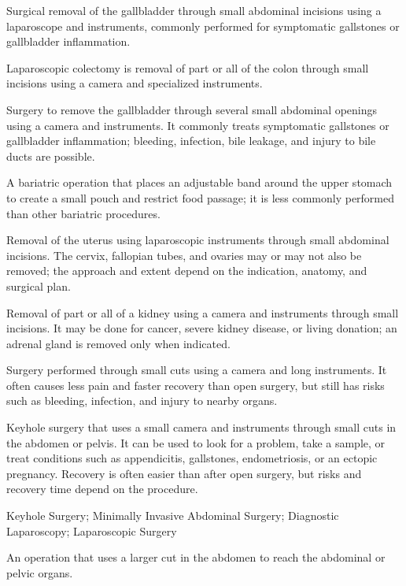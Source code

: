  Surgical removal of the gallbladder through small abdominal incisions using a laparoscope and instruments, commonly performed for symptomatic gallstones or gallbladder inflammation.

 Laparoscopic colectomy is removal of part or all of the colon through small incisions using a camera and specialized instruments.

 Surgery to remove the gallbladder through several small abdominal openings using a camera and instruments. It commonly treats symptomatic gallstones or gallbladder inflammation; bleeding, infection, bile leakage, and injury to bile ducts are possible.

 A bariatric operation that places an adjustable band around the upper stomach to create a small pouch and restrict food passage; it is less commonly performed than other bariatric procedures.

 Removal of the uterus using laparoscopic instruments through small abdominal incisions. The cervix, fallopian tubes, and ovaries may or may not also be removed; the approach and extent depend on the indication, anatomy, and surgical plan.

 Removal of part or all of a kidney using a camera and instruments through small incisions. It may be done for cancer, severe kidney disease, or living donation; an adrenal gland is removed only when indicated.

 Surgery performed through small cuts using a camera and long instruments. It often causes less pain and faster recovery than open surgery, but still has risks such as bleeding, infection, and injury to nearby organs.

 Keyhole surgery that uses a small camera and instruments through small cuts in the abdomen or pelvis. It can be used to look for a problem, take a sample, or treat conditions such as appendicitis, gallstones, endometriosis, or an ectopic pregnancy. Recovery is often easier than after open surgery, but risks and recovery time depend on the procedure.

\synonyms
Keyhole Surgery; Minimally Invasive Abdominal Surgery; Diagnostic Laparoscopy; Laparoscopic Surgery

 An operation that uses a larger cut in the abdomen to reach the abdominal or pelvic organs.


